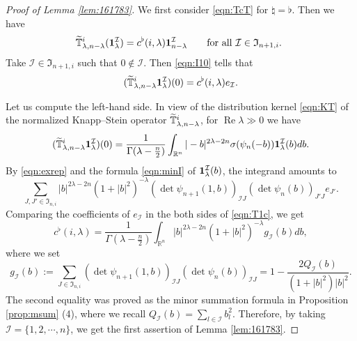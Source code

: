 \begin{proof}
[Proof of Lemma \ref{lem:161783}]
We first consider \eqref{eqn:TcT} 
 for $\natural = \flat$.  
Then we have 
\[
  \widetilde{{\mathbb{T}}}_{{\lambda},{n-\lambda}}^{{i}} ({\bf{1}}_{\lambda}^{\mathcal{I}})
= c^{\flat}(i,\lambda) {\bf{1}}_{n-\lambda}^{\mathcal{I}}
\qquad
\text{for all ${\mathcal{I}} \in {\mathfrak{I}}_{n+1,i}$.  }
\]
Take ${\mathcal{I}} \in {\mathfrak{I}}_{n+1,i}$
 such that $0 \not\in {\mathcal{I}}$.  
Then \eqref{eqn:I10} tells that 
\begin{equation}
\label{eqn:T1c}
(\widetilde{{\mathbb{T}}}_{{\lambda},{n-\lambda}}^{{i}} {\bf{1}}_{\lambda}^{\mathcal{I}})
(0)
=
c^{\flat}(i,\lambda)e_{\mathcal{I}}.  
\end{equation}



Let us compute the left-hand side.  
In view of the distribution kernel \eqref{eqn:KT}
 of the normalized Knapp--Stein operator $\widetilde{{\mathbb{T}}}_{{\lambda},{n-\lambda}}^{{i}}$, 
 for $\operatorname{Re}\lambda \gg 0$
 we have
\begin{equation*}
(\widetilde{{\mathbb{T}}}_{{\lambda},{n-\lambda}}^{{i}} {\bf{1}}_{\lambda}^{\mathcal{I}})(0)
= \frac{1}{\Gamma(\lambda - \frac n 2)} \int_{\mathbb{R}^n}
   |-b|^{2 \lambda-2n} \sigma(\psi_n(-b)){\mathbf{1}}_{\lambda}^{\mathcal{I}}(b)db.  
\end{equation*}
By \eqref{eqn:exrep} and the formula \eqref{eqn:minI}
 of ${\bf{1}}_{\lambda}^{\mathcal{I}}(b)$, 
 the integrand amounts to 
\begin{equation*}
\sum_{J,J' \in {\mathfrak{I}}_{n,i}}
   |b|^{2 \lambda-2n} (1+|b|^2)^{-\lambda}
   (\det \psi_{n+1}(1,b))_{{\mathcal{I}} J}
   (\det \psi_n(b))_{J' J} e_{J'}.  
\end{equation*}
Comparing the coefficients
 of $e_{\mathcal{I}}$ in the both sides of \eqref{eqn:T1c}, 
 we get 
\[
   c^{\flat}(i,\lambda)
   =
   \frac{1}{\Gamma(\lambda-\frac n 2)}
   \int_{\mathbb{R}^n}
   |b|^{2 \lambda-2n} (1+|b|^2)^{-\lambda}
   g_{\mathcal{I}}(b)d b, 
\]
where we set 
\begin{equation}
   g_{\mathcal{I}}(b):=
   \sum_{J \in {\mathfrak{I}}_{n,i}}
   (\det \psi_{n+1} (1,b))_{{\mathcal{I}} J} 
   (\det \psi_n (b))_{{\mathcal{I}} J}
   =1-\frac{2 Q_{\mathcal{I}}(b)}{(1+|b|^2) |b|^2}.  
\label{eqn:Timinor}
\end{equation}
The second equality was proved as the minor summation formula
 in Proposition \ref{prop:msum} (4), 
 where we recall $Q_{\mathcal{I}}(b)=\sum_{l \in {\mathcal{I}}}b_l^2$.  
Therefore, 
 by taking ${\mathcal{I}}=\{1,2, \cdots, n\}$, 
 we get the first assertion
 of Lemma \ref{lem:161783}.  




\end{proof}
